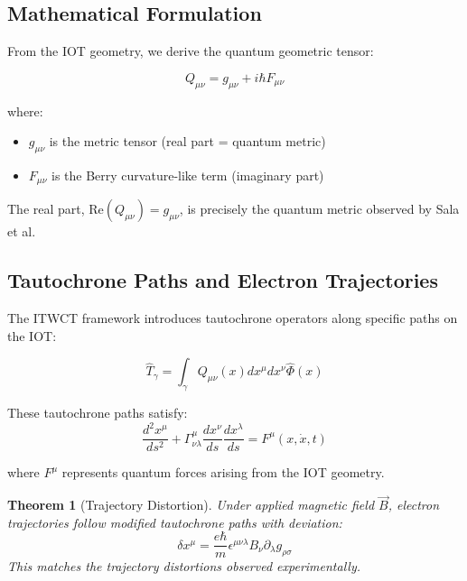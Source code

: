 \documentclass[conference]{IEEEtran}
\newtheorem{theorem}{Theorem}
\begin{document}
\subsection{Mathematical Formulation}

From the IOT geometry, we derive the quantum geometric tensor:

\begin{equation}
Q_{\mu\nu} = g_{\mu\nu} + i\hbar F_{\mu\nu}
\end{equation}

where:
\begin{itemize}
\item $g_{\mu\nu}$ is the metric tensor (real part = quantum metric)
\item $F_{\mu\nu}$ is the Berry curvature-like term (imaginary part)
\end{itemize}

The real part, $\text{Re}(Q_{\mu\nu}) = g_{\mu\nu}$, is precisely the quantum metric observed by Sala et al.

\subsection{Tautochrone Paths and Electron Trajectories}

The ITWCT framework introduces tautochrone operators along specific paths on the IOT:

\begin{equation}
\hat{T}_\gamma = \int_\gamma Q_{\mu\nu}(x) dx^\mu dx^\nu \hat{\Phi}(x)
\end{equation}

These tautochrone paths satisfy:
\begin{equation}
\frac{d^2 x^\mu}{ds^2} + \Gamma^\mu_{\nu\lambda} \frac{dx^\nu}{ds} \frac{dx^\lambda}{ds} = F^\mu(x, \dot{x}, t)
\end{equation}

where $F^\mu$ represents quantum forces arising from the IOT geometry.

\begin{theorem}[Trajectory Distortion]
Under applied magnetic field $\vec{B}$, electron trajectories follow modified tautochrone paths with deviation:
\begin{equation}
\delta x^\mu = \frac{e\hbar}{m} \epsilon^{\mu\nu\lambda} B_\nu \partial_\lambda g_{\rho\sigma}
\end{equation}
This matches the trajectory distortions observed experimentally.
\end{theorem}
\end{document}
